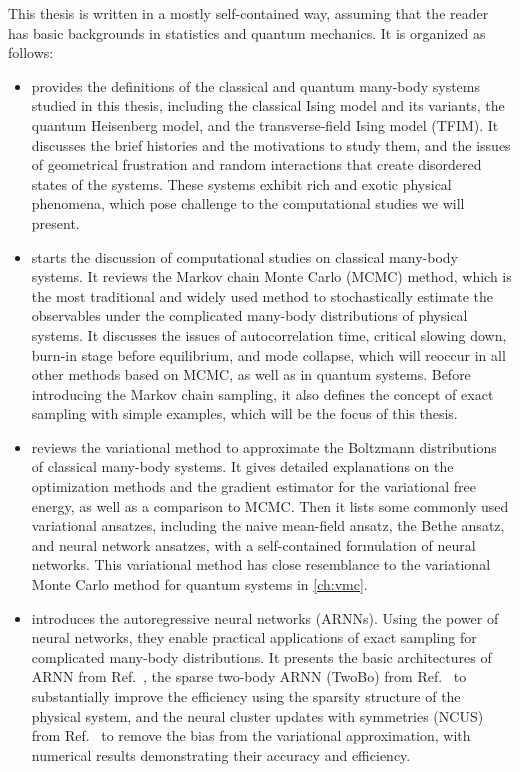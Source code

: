 This thesis is written in a mostly self-contained way, assuming that the reader has basic backgrounds in statistics and quantum mechanics. It is organized as follows:
\begin{itemize}
\item {} provides the definitions of the classical and quantum many-body systems studied in this thesis, including the classical Ising model and its variants, the quantum Heisenberg model, and the transverse-field Ising model (TFIM).
It discusses the brief histories and the motivations to study them, and the issues of geometrical frustration and random interactions that create disordered states of the systems. These systems exhibit rich and exotic physical phenomena, which pose challenge to the computational studies we will present.
\item {} starts the discussion of computational studies on classical many-body systems. It reviews the Markov chain Monte Carlo (MCMC) method, which is the most traditional and widely used method to stochastically estimate the observables under the complicated many-body distributions of physical systems.
It discusses the issues of autocorrelation time, critical slowing down, burn-in stage before equilibrium, and mode collapse, which will reoccur in all other methods based on MCMC, as well as in quantum systems.
Before introducing the Markov chain sampling, it also defines the concept of exact sampling with simple examples, which will be the focus of this thesis.
\item {} reviews the variational method to approximate the Boltzmann distributions of classical many-body systems.
It gives detailed explanations on the optimization methods and the gradient estimator for the variational free energy, as well as a comparison to MCMC.
Then it lists some commonly used variational ansatzes, including the naive mean-field ansatz, the Bethe ansatz, and neural network ansatzes, with a self-contained formulation of neural networks.
This variational method has close resemblance to the variational Monte Carlo method for quantum
systems in \cref{ch:vmc}.
\item {} introduces the autoregressive neural networks (ARNNs). Using the power of neural networks, they enable practical applications of exact sampling for complicated many-body distributions.
It presents the basic architectures of ARNN from Ref.~\cite{wu2019solving}, the sparse two-body ARNN (TwoBo) from Ref.~\cite{biazzo2024sparse} to substantially improve the efficiency using the sparsity structure of the physical system, and the neural cluster updates with symmetries (NCUS) from Ref.~\cite{wu2021unbiased} to remove the bias from the variational approximation, with numerical results demonstrating their accuracy and efficiency.

\end{itemize}
